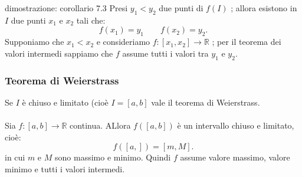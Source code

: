 \documentclass[x11names]{article}
\begin{document}
\begin{es}{dimostrazione: corollario 7.3}
Presi $y_1 < y_2$ due punti di $f\left(I\right)$ ; allora esistono in $I$ due punti $x_1$ e $x_2$ tali che:
\[
f\left(x_1\right) = y_1 \qquad f\left(x_2\right) = y_2
.\] 
Supponiamo che $x_1 < x_2$ e consideriamo $f:\left[x_1,x_2\right] \rightarrow \mathbb{R}$ ; per il teorema dei valori intermedi sappiamo che $f$ assume tutti i valori tra $y_1$ e $y_2$.
\end{es}

\newpage
\subsubsection{Teorema di Weierstrass}
Se $I$ è chiuso e limitato (cioè $I=\left[a,b\right]$ vale il teorema di Weierstrass.
\\ \\
Sia $f:\left[a,b\right] \rightarrow \mathbb{R}$ continua. ALlora $f\left(\left[a,b\right]\right)$ è un intervallo chiuso e limitato, cioè:
 \[
f\left(\left[a,\right]\right) = \left[m,M\right]
.\] 
in cui $m$ e $M$ sono massimo e minimo. Quindi $f$ assume valore massimo, valore minimo e tutti i valori intermedi.
\end{document}
